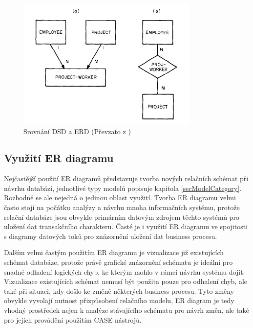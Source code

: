 \documentclass[czech,bachelor,public,dept460,male,oneside]{diploma}
\begin{document}
	\begin{figure}[!h]
		\centering
		\includegraphics[width=0.80\textwidth]{Figures/ChenVsDSD}
		\subfloat[ER diagram]{\hspace{.25\linewidth}}
		\caption[Srovnání DSD a ERD]{Srovnání DSD a ERD (Převzato z \cite{chenERD})}
		\label{fig:chenERDCmp}
	\end{figure}
	
	\subsection{Využití ER diagramu}
	Nejčastější použití ER diagramů představuje tvorba nových relačních schémat při návrhu databází, jednotlivé typy modelů popisuje kapitola \ref{secModelCategory}. Rozhodně se ale nejedná o jedinou oblast využití. Tvorba ER diagramu velmi často stojí na počátku analýzy a návrhu mnoha informačních systému, protože relační databáze jsou obvykle primárním datovým zdrojem těchto systémů pro uložení dat transakčního charakteru. Časté je i využití ER diagramu ve spojitosti s diagramy datových toků pro znázornění uložení dat business procesu. 
	
	Dalším velmi častým použitím ER diagramu je vizualizace již existujících schémat databáze, protože právě grafické znázornění schématu je ideální pro snadné odhalení logických chyb, ke kterým mohlo v rámci návrhu systému dojít.
	Vizualizace existujících schémat nemusí být použita pouze pro odhalení chyb, ale také při situaci, kdy došlo ke změně některých business procesu. Tyto změny obvykle vyvolají nutnost přizpůsobení relačního modelu, ER diagram je tedy vhodný prostředek nejen k analýze stávajícího schématu pro návrh změn, ale také pro jejich provádění použitím CASE nástrojů.
	
\end{document}
